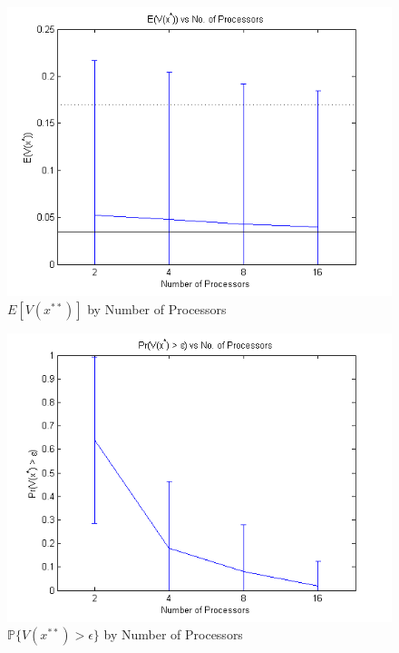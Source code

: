 \documentclass[12pt]{article}
\begin{document}
\begin{figure}[ht]
	\centering
		\includegraphics{../plot/figs/expviolprob_numproc.png}
	\caption{$E[V(x^{**})]$ by Number of Processors}
	\label{fig:expviolprob_numproc}
\end{figure}

\begin{figure}[ht]
	\centering
		\includegraphics{../plot/figs/probviolprobgreateps_numproc.png}
	\caption{$\mathbb{P}\{V(x^{**}) > \epsilon \}$ by Number of Processors}
	\label{fig:probviolprobgreateps_numproc}
\end{figure}
\end{document}
